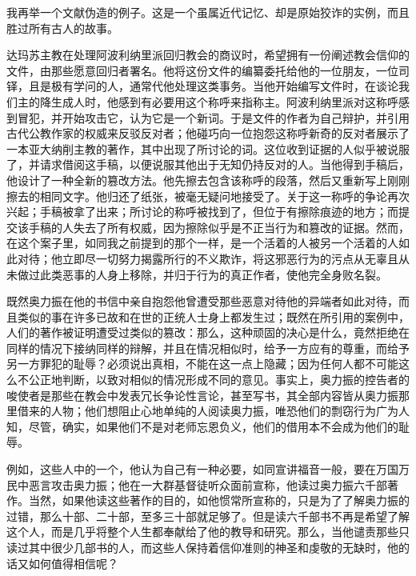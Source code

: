 我再举一个文献伪造的例子。这是一个虽属近代记忆、却是原始狡诈的实例，而且胜过所有古人的故事。\par

达玛苏主教在处理阿波利纳里派回归教会的商议时，希望拥有一份阐述教会信仰的文件，由那些愿意回归者署名。他将这份文件的编纂委托给他的一位朋友，一位司铎，且是极有学问的人，通常代他处理这类事务。当他开始编写文件时，在谈论我们主的降生成人时，他感到有必要用这个称呼来指称主。阿波利纳里派对这称呼感到冒犯，并开始攻击它，认为它是一个新词。于是文件的作者为自己辩护，并引用古代公教作家的权威来反驳反对者；他碰巧向一位抱怨这称呼新奇的反对者展示了一本亚大纳削主教的著作，其中出现了所讨论的词。这位收到证据的人似乎被说服了，并请求借阅这手稿，以便说服其他出于无知仍持反对的人。当他得到手稿后，他设计了一种全新的篡改方法。他先擦去包含该称呼的段落，然后又重新写上刚刚擦去的相同文字。他归还了纸张，被毫无疑问地接受了。关于这一称呼的争论再次兴起；手稿被拿了出来；所讨论的称呼被找到了，但位于有擦除痕迹的地方；而提交该手稿的人失去了所有权威，因为擦除似乎是不正当行为和篡改的证据。然而，在这个案子里，如同我之前提到的那个一样，是一个活着的人被另一个活着的人如此对待；他立即尽一切努力揭露所行的不义欺诈，将这邪恶行为的污点从无辜且从未做过此类恶事的人身上移除，并归于行为的真正作者，使他完全身败名裂。\par

既然奥力振在他的书信中亲自抱怨他曾遭受那些恶意对待他的异端者如此对待，而且类似的事在许多已故和在世的正统人士身上都发生过；既然在所引用的案例中，人们的著作被证明遭受过类似的篡改：那么，这种顽固的决心是什么，竟然拒绝在同样的情况下接纳同样的辩解，并且在情况相似时，给予一方应有的尊重，而给予另一方罪犯的耻辱？必须说出真相，不能在这一点上隐藏；因为任何人都不可能这么不公正地判断，以致对相似的情况形成不同的意见。事实上，奥力振的控告者的唆使者是那些在教会中发表冗长争论性言论，甚至写书，其全部内容皆从奥力振那里借来的人物；他们想阻止心地单纯的人阅读奥力振，唯恐他们的剽窃行为广为人知，尽管，确实，如果他们不是对老师忘恩负义，他们的借用本不会成为他们的耻辱。\par

例如，这些人中的一个，他认为自己有一种必要，如同宣讲福音一般，要在万国万民中恶言攻击奥力振；他在一大群基督徒听众面前宣称，他读过奥力振六千部著作。当然，如果他读这些著作的目的，如他惯常所宣称的，只是为了了解奥力振的过错，那么十部、二十部，至多三十部就足够了。但是读六千部书不再是希望了解这个人，而是几乎将整个人生都奉献给了他的教导和研究。那么，当他谴责那些只读过其中很少几部书的人，而这些人保持着信仰准则的神圣和虔敬的无缺时，他的话又如何值得相信呢？\par

